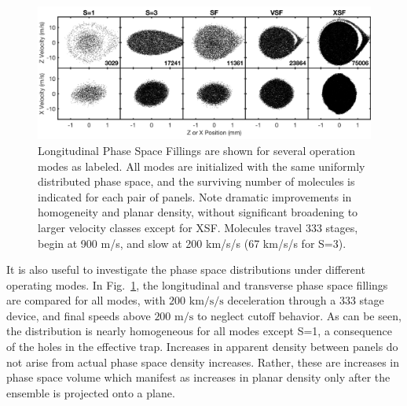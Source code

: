 \documentclass[%
 reprint,
 amsmath,amssymb,
 aps,
prl,
]{revtex4-1}
\begin{document}


\begin{figure}[t]
\includegraphics[width=\linewidth]{5x2-PSD-Compare.png}
\vspace{-22pt}
\caption{\label{fig:phasespace}
Longitudinal Phase Space Fillings are shown for several operation modes as labeled. 
All modes are initialized with the same uniformly distributed phase space, and the surviving number of molecules is indicated for each pair of panels.
Note dramatic improvements in homogeneity and planar density, without significant broadening to larger velocity classes except for XSF. 
Molecules travel $333$ stages, begin at 900 m/s, and slow at 200 km/s/s (67 km/s/s for S=3).
}
\end{figure}

It is also useful to investigate the phase space distributions under different operating modes.
In Fig.~\ref{fig:phasespace}, the longitudinal and transverse phase space fillings are compared for all modes, with $200\text{ km/s/s}$ deceleration through a 333 stage device, and final speeds above $200\text{ m/s}$ to neglect cutoff behavior. 
As can be seen, the distribution is nearly homogeneous for all modes except S=1, a consequence of the holes in the effective trap. 
Increases in apparent density between panels do not arise from actual phase space density increases. 
Rather, these are increases in phase space volume which manifest as increases in planar density only after the ensemble is projected onto a plane.
\end{document}
